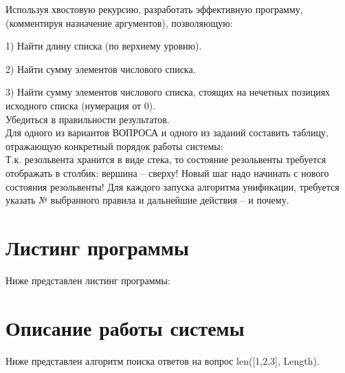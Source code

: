 \Large Используя хвостовую рекурсию, разработать эффективную программу, (комментируя назначение аргументов), позволяющую:

1)	Найти длину списка (по верхнему уровню).

2)	Найти сумму элементов числового списка.

3)	Найти сумму элементов числового списка, стоящих на нечетных позициях исходного списка (нумерация от 0).
\\
Убедиться в правильности результатов.\\
Для одного из вариантов ВОПРОСА и одного из заданий  составить таблицу, отражающую конкретный порядок работы системы: \\
Т.к. резольвента хранится в виде стека, то состояние резольвенты требуется отображать в столбик: вершина – сверху! Новый шаг надо начинать с нового состояния резольвенты! Для каждого запуска алгоритма унификации, требуется указать № выбранного правила и дальнейшие действия – и почему.



\newpage
\section*{Листинг программы}
Ниже представлен листинг программы:


\section*{Описание работы системы}

Ниже представлен алгоритм поиска ответов на вопрос len([1,2,3], Length).

